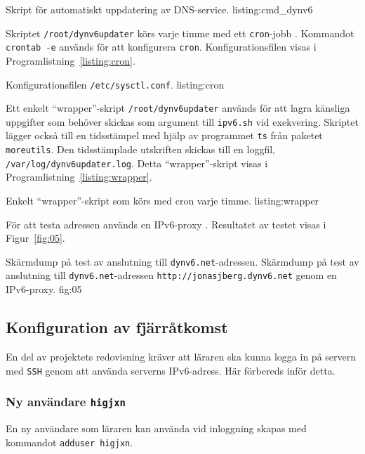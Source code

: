             {Skript för automatiskt uppdatering av DNS-service.}
            {listing:cmd_dynv6}


Skriptet \texttt{/root/dynv6updater} körs varje timme med ett
\texttt{cron}-jobb \cite{misc:crontutorial} \cite{misc:cronintro}.  Kommandot
\texttt{crontab -e} används för att konfigurera \texttt{cron}.
Konfigurationsfilen visas i Programlistning~\ref{listing:cron}.

             {Konfigurationsfilen \texttt{/etc/sysctl.conf}.}
             {listing:cron}


Ett enkelt ``wrapper''-skript \texttt{/root/dynv6updater} används för att lagra
känsliga uppgifter som behöver skickas som argument till \texttt{ipv6.sh} vid
exekvering.  Skriptet lägger också till en tidsstämpel med hjälp av programmet
\texttt{ts} från paketet \texttt{moreutils}. Den tidsstämplade utskriften skickas
till en loggfil, \texttt{/var/log/dynv6updater.log}.
Detta ``wrapper''-skript visas i Programlistning~\ref{listing:wrapper}.

            {Enkelt ``wrapper''-skript som körs med cron varje timme.}
            {listing:wrapper}


För att testa adressen används en IPv6-proxy \cite{ipv6:ipv6proxy}.
Resultatet av testet visas i Figur~\ref{fig:05}.

           {Skärmdump på test av anslutning till \texttt{dynv6.net}-adressen.}
           {Skärmdump på test av anslutning till \texttt{dynv6.net}-adressen 
					  \texttt{http://jonasjberg.dynv6.net} genom en IPv6-proxy.}
           {fig:05}


\subsection{Konfiguration av fjärråtkomst}
En del av projektets redovisning kräver att läraren ska kunna logga in på
servern med \texttt{SSH} genom att använda serverns IPv6-adress. Här förbereds inför
detta.


\subsubsection{Ny användare \texttt{higjxn}}
En ny användare som läraren kan använda vid inloggning skapas med kommandot
\texttt{adduser higjxn}.

